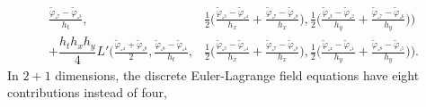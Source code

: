 \documentclass[12pt,a4paper,reqno]{article}
\begin{document}
\begin{align}
  \tfrac{\tilde{\ensuremath{\varphi}}_{\square^{7}} - \tilde{\ensuremath{\varphi}}_{\square^{3}}}{h_{t}} ,
& \tfrac{1}{2} \Big( \tfrac{\tilde{\ensuremath{\varphi}}_{\square^{3}} - \tilde{\ensuremath{\varphi}}_{\square^{4}}}{h_{x}}
                   + \tfrac{\tilde{\ensuremath{\varphi}}_{\square^{7}} - \tilde{\ensuremath{\varphi}}_{\square^{8}}}{h_{x}} \Big) ,
  \tfrac{1}{2} \Big( \tfrac{\tilde{\ensuremath{\varphi}}_{\square^{3}} - \tilde{\ensuremath{\varphi}}_{\square^{2}}}{h_{y}}
                   + \tfrac{\tilde{\ensuremath{\varphi}}_{\square^{7}} - \tilde{\ensuremath{\varphi}}_{\square^{6}}}{h_{y}} \Big)
\Big) \\
+ \dfrac{h_{t} h_{x} h_{y}}{4} L' \Big(
  \tfrac{\tilde{\ensuremath{\varphi}}_{\square^{4}} + \tilde{\ensuremath{\varphi}}_{\square^{8}}}{2} ,
  \tfrac{\tilde{\ensuremath{\varphi}}_{\square^{8}} - \tilde{\ensuremath{\varphi}}_{\square^{4}}}{h_{t}} ,
& \tfrac{1}{2} \Big( \tfrac{\tilde{\ensuremath{\varphi}}_{\square^{3}} - \tilde{\ensuremath{\varphi}}_{\square^{4}}}{h_{x}}
                   + \tfrac{\tilde{\ensuremath{\varphi}}_{\square^{7}} - \tilde{\ensuremath{\varphi}}_{\square^{8}}}{h_{x}} \Big) ,
  \tfrac{1}{2} \Big( \tfrac{\tilde{\ensuremath{\varphi}}_{\square^{4}} - \tilde{\ensuremath{\varphi}}_{\square^{1}}}{h_{y}}
                   + \tfrac{\tilde{\ensuremath{\varphi}}_{\square^{8}} - \tilde{\ensuremath{\varphi}}_{\square^{5}}}{h_{y}} \Big)
\Big) .
\end{align}
\endgroup
In $2+1$ dimensions, the discrete Euler-Lagrange field equations have eight contributions instead of four,
\begingroup
\allowdisplaybreaks
\end{document}
